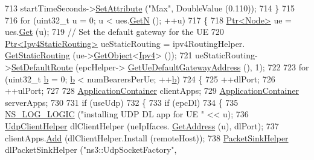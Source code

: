 \begin{DoxyCode}
713           startTimeSeconds->\hyperlink{classns3_1_1ObjectBase_ac60245d3ea4123bbc9b1d391f1f6592f}{SetAttribute} (\textcolor{stringliteral}{"Max"}, DoubleValue (0.110));
714         \}
715 
716       \textcolor{keywordflow}{for} (uint32\_t u = 0; u < ues.\hyperlink{classns3_1_1NodeContainer_aed647ac56d0407a7706aba02eb44b951}{GetN} (); ++u)
717         \{
718           \hyperlink{classns3_1_1Ptr}{Ptr<Node>} ue = ues.\hyperlink{classns3_1_1NodeContainer_a9ed96e2ecc22e0f5a3d4842eb9bf90bf}{Get} (u);
719           \textcolor{comment}{// Set the default gateway for the UE}
720           \hyperlink{classns3_1_1Ptr}{Ptr<Ipv4StaticRouting>} ueStaticRouting = ipv4RoutingHelper.
      \hyperlink{classns3_1_1Ipv4StaticRoutingHelper_a731206e50d305695dac7fb2ef963a4bb}{GetStaticRouting} (ue->\hyperlink{classns3_1_1Object_a13e18c00017096c8381eb651d5bd0783}{GetObject}<\hyperlink{classns3_1_1Ipv4}{Ipv4}> ());
721           ueStaticRouting->\hyperlink{classns3_1_1Ipv4StaticRouting_aee30fa3246c2b42f122dabdff2725331}{SetDefaultRoute} (epcHelper->
      \hyperlink{classns3_1_1PointToPointEpcHelper_a9160d83b92d5ea373abcd627f5d784f5}{GetUeDefaultGatewayAddress} (), 1);
722 
723           \textcolor{keywordflow}{for} (uint32\_t \hyperlink{buildings__pathloss_8m_a21ad0bd836b90d08f4cf640b4c298e7c}{b} = 0; \hyperlink{buildings__pathloss_8m_a21ad0bd836b90d08f4cf640b4c298e7c}{b} < numBearersPerUe; ++\hyperlink{buildings__pathloss_8m_a21ad0bd836b90d08f4cf640b4c298e7c}{b})
724             \{
725               ++dlPort;
726               ++ulPort;
727 
728               \hyperlink{classns3_1_1ApplicationContainer}{ApplicationContainer} clientApps;
729               \hyperlink{classns3_1_1ApplicationContainer}{ApplicationContainer} serverApps;
730 
731               \textcolor{keywordflow}{if} (useUdp)
732                 \{
733                   \textcolor{keywordflow}{if} (epcDl)
734                     \{
735                       \hyperlink{group__logging_ga88acd260151caf2db9c0fc84997f45ce}{NS\_LOG\_LOGIC} (\textcolor{stringliteral}{"installing UDP DL app for UE "} << u);
736                       \hyperlink{classns3_1_1UdpClientHelper}{UdpClientHelper} dlClientHelper (ueIpIfaces.
      \hyperlink{classns3_1_1Ipv4InterfaceContainer_ae63208dcd222be986822937ee4aa828c}{GetAddress} (u), dlPort);
737                       clientApps.\hyperlink{classns3_1_1ApplicationContainer_ad09ab1a1ad5849d518d5f4c262e38152}{Add} (dlClientHelper.Install (remoteHost));
738                       \hyperlink{classns3_1_1PacketSinkHelper}{PacketSinkHelper} dlPacketSinkHelper (\textcolor{stringliteral}{"ns3::UdpSocketFactory"}, 

\end{DoxyCode}
